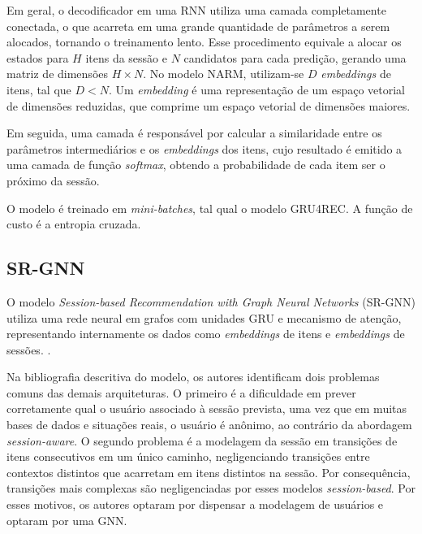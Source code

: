 Em geral, o decodificador em uma RNN utiliza uma camada completamente conectada,
o que acarreta em uma grande quantidade de parâmetros a serem alocados, tornando
o treinamento lento. Esse procedimento equivale a alocar os estados para $H$
itens da sessão e $N$ candidatos para cada predição, gerando uma matriz de
dimensões ${H \times N}$. No modelo NARM, utilizam-se $D$ \textit{embeddings} de
itens, tal que $D < N$. Um \textit{embedding} é uma representação de um espaço
vetorial de dimensões reduzidas, que comprime um espaço vetorial de dimensões
maiores.

Em seguida, uma camada é responsável por calcular a
similaridade entre os parâmetros intermediários e os \textit{embeddings} dos
itens, cujo resultado é emitido a uma camada de função \textit{softmax}, obtendo
a probabilidade de cada item ser o próximo da sessão.

O modelo é treinado em \textit{mini-batches}, tal qual o modelo GRU4REC. A
função de custo é a entropia cruzada.


\subsection{SR-GNN}
O modelo \textit{Session-based Recommendation with Graph Neural Networks}
(SR-GNN) utiliza uma rede neural em grafos com unidades GRU e mecanismo de
atenção, representando internamente os dados como \textit{embeddings} de itens
e \textit{embeddings} de sessões. \cite{gnn}.

Na bibliografia descritiva do modelo, os autores identificam dois problemas
comuns das demais arquiteturas. O primeiro é a dificuldade em prever
corretamente qual o usuário associado à sessão prevista, uma vez que em muitas
bases de dados e situações reais, o usuário é anônimo, ao contrário da abordagem
\textit{session-aware}. O segundo problema é a modelagem da sessão em transições
de itens consecutivos em um único caminho, negligenciando transições entre
contextos distintos que acarretam em itens distintos na sessão. Por
consequência, transições mais complexas são negligenciadas por esses modelos
\textit{session-based}. Por esses motivos, os autores optaram por dispensar a
modelagem de usuários e optaram por uma GNN.

